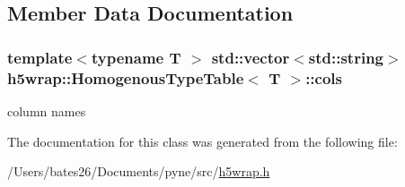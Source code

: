 \subsection{Member Data Documentation}
\hypertarget{classh5wrap_1_1_homogenous_type_table_a8b60fa54475f44bea26caab0137d8507}{
\subsubsection[{cols}]{\setlength{\rightskip}{0pt plus 5cm}template$<$typename T $>$ std\+::vector$<$std\+::string$>$ {\bf h5wrap\+::\+Homogenous\+Type\+Table}$<$ T $>$\+::cols}}\label{classh5wrap_1_1_homogenous_type_table_a8b60fa54475f44bea26caab0137d8507}
column names 

The documentation for this class was generated from the following file\+:\begin{DoxyCompactItemize}
\item 
/\+Users/bates26/\+Documents/pyne/src/\hyperlink{h5wrap_8h}{h5wrap.\+h}\end{DoxyCompactItemize}
